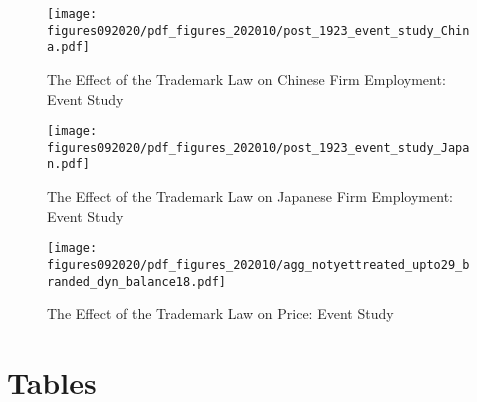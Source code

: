 \documentclass[12pt]{article}
\begin{document}
\begin{figure}[ht]
    \centering
    \texttt{[image: figures092020/pdf\_figures\_202010/post\_1923\_event\_study\_China.pdf]} 
    \caption{The Effect of the Trademark Law on Chinese Firm Employment: Event Study}
    \label{fig:chinaevent}            
\end{figure}

\begin{figure}[ht]
    \centering
    \texttt{[image: figures092020/pdf\_figures\_202010/post\_1923\_event\_study\_Japan.pdf]}  
    \caption{The Effect of the Trademark Law on Japanese Firm Employment: Event Study}
    \label{fig:japanevent}            
\end{figure}




\begin{figure}[ht]
    \centering
    \texttt{[image: figures092020/pdf\_figures\_202010/agg\_notyettreated\_upto29\_branded\_dyn\_balance18.pdf]} 
    \caption{The Effect of the Trademark Law on Price: Event Study}
    \label{fig:priceevent} 
\end{figure}






\clearpage
\section{Tables}
\end{document}
